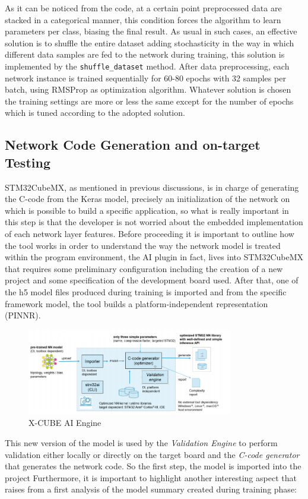 As it can be noticed from the code, at a certain point preprocessed data are stacked in a categorical manner, this condition forces the algorithm to learn parameters per class, biasing the final result. As usual in such cases, an effective solution is to shuffle the entire dataset adding stochasticity in the way in which different data samples are fed to the network during training, this solution is implemented by the \texttt{shuffle_dataset} method.\newline
After data preprocessing, each network instance is trained sequentially for 60-80 epochs with 32 samples per batch, using RMSProp as optimization algorithm. Whatever solution is chosen the training settings are more or less the same except for the number of epochs which is tuned according to the adopted  solution.


\subsection{Network Code Generation and on-target Testing}
STM32CubeMX, as mentioned in previous discussions, is in charge of generating the C-code from the Keras model, precisely an initialization of the network on which is possible to build a specific application, so what is really important in this step is that the developer is not worried about the embedded implementation of each network layer features.\newline
Before proceeding it is important to outline how the tool works in order to understand the way the network model is treated within the program environment, the AI plugin in fact, lives into STM32CubeMX that requires some preliminary configuration including the creation of a new project and some specification of the development board used. After that, one of the h5 model files produced during training is imported and from the specific framework model, the tool builds a platform-independent representation (PINNR).\newline 
\begin{figure}[H]
	\hfill\includegraphics[width=0.8\textwidth]{figures/stm32cubeai_arch.png}\hspace*{\fill}
	\caption{X-CUBE AI Engine}
\end{figure}  
This new version of the model is used by the \textit{Validation Engine} to perform validation either locally or directly on the target board and the \textit{C-code generator} that generates the network code.\newline
So the first step, the model is imported into the project
Furthermore, it is important to highlight another interesting aspect that raises from a first analysis of the model summary created during training phase:

